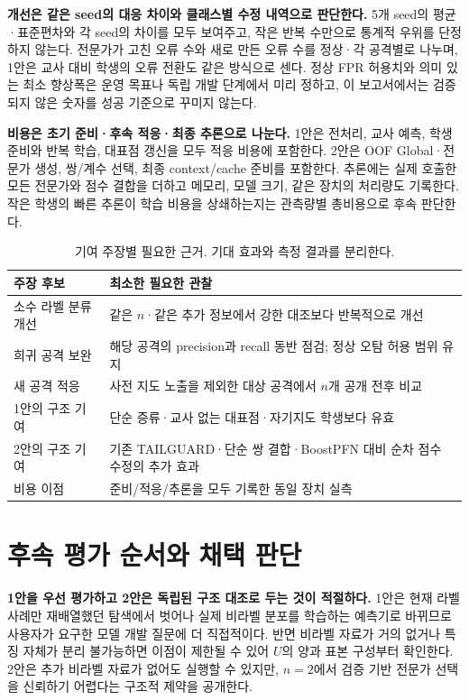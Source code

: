 \textbf{개선은 같은 seed의 대응 차이와 클래스별 수정 내역으로 판단한다.} 5개 seed의 평균·표준편차와 각 seed의 차이를 모두 보여주고, 작은 반복 수만으로 통계적 우위를 단정하지 않는다. 전문가가 고친 오류 수와 새로 만든 오류 수를 정상·각 공격별로 나누며, 1안은 교사 대비 학생의 오류 전환도 같은 방식으로 센다. 정상 FPR 허용치와 의미 있는 최소 향상폭은 운영 목표나 독립 개발 단계에서 미리 정하고, 이 보고서에서는 검증되지 않은 숫자를 성공 기준으로 꾸미지 않는다.

\textbf{비용은 초기 준비·후속 적응·최종 추론으로 나눈다.} 1안은 전처리, 교사 예측, 학생 준비와 반복 학습, 대표점 갱신을 모두 적응 비용에 포함한다. 2안은 OOF Global·전문가 생성, 쌍/계수 선택, 최종 context/cache 준비를 포함한다. 추론에는 실제 호출한 모든 전문가와 점수 결합을 더하고 메모리, 모델 크기, 같은 장치의 처리량도 기록한다. 작은 학생의 빠른 추론이 학습 비용을 상쇄하는지는 관측량별 총비용으로 후속 판단한다.

\begin{table}[H]\centering\small
\caption{기여 주장별 필요한 근거. 기대 효과와 측정 결과를 분리한다.}
\begin{tabularx}{\linewidth}{p{.29\linewidth}Y}
\toprule
주장 후보 & 최소한 필요한 관찰\\\midrule
소수 라벨 분류 개선 & 같은 $n$·같은 추가 정보에서 강한 대조보다 반복적으로 개선\\
희귀 공격 보완 & 해당 공격의 precision과 recall 동반 점검; 정상 오탐 허용 범위 유지\\
새 공격 적응 & 사전 지도 노출을 제외한 대상 공격에서 $n$개 공개 전후 비교\\
1안의 구조 기여 & 단순 증류·교사 없는 대표점·자기지도 학생보다 유효\\
2안의 구조 기여 & 기존 TAILGUARD·단순 쌍 결합·BoostPFN 대비 순차 점수 수정의 추가 효과\\
비용 이점 & 준비/적응/추론을 모두 기록한 동일 장치 실측\\\bottomrule
\end{tabularx}
\end{table}

\section{후속 평가 순서와 채택 판단}
\textbf{1안을 우선 평가하고 2안은 독립된 구조 대조로 두는 것이 적절하다.} 1안은 현재 라벨 사례만 재배열했던 탐색에서 벗어나 실제 비라벨 분포를 학습하는 예측기로 바뀌므로 사용자가 요구한 모델 개발 질문에 더 직접적이다. 반면 비라벨 자료가 거의 없거나 특징 자체가 분리 불가능하면 이점이 제한될 수 있어 $U$의 양과 표본 구성부터 확인한다. 2안은 추가 비라벨 자료가 없어도 실행할 수 있지만, $n=2$에서 검증 기반 전문가 선택을 신뢰하기 어렵다는 구조적 제약을 공개한다.

